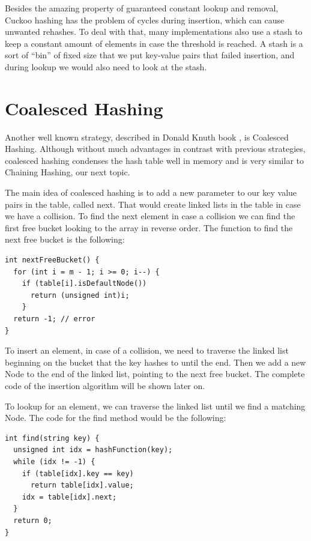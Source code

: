 Besides the amazing property of guaranteed constant lookup and removal, Cuckoo hashing has the problem of cycles during insertion, which can cause unwanted rehashes. To deal with that, many implementations also use a stash to keep a constant amount of elements in case the threshold is reached. A stash is a sort of ``bin'' of fixed size that we put key-value pairs that failed insertion, and during lookup we would also need to look at the stash.

\section{Coalesced Hashing}

Another well known strategy, described in Donald Knuth book \citep{TAOCP3}, is Coalesced Hashing. Although without much advantages in contrast with previous strategies, coalesced hashing condenses the hash table well in memory and is very similar to Chaining Hashing, our next topic.

The main idea of coalesced hashing is to add a new parameter to our key value pairs in the table, called next. That would create linked lists in the table in case we have a collision. To find the next element in case a collision we can find the first free bucket looking to the array in reverse order. The function to find the next free bucket is the following:

\begin{lstlisting}
int nextFreeBucket() {
  for (int i = m - 1; i >= 0; i--) {
    if (table[i].isDefaultNode())
      return (unsigned int)i;
    }
  return -1; // error
}
\end{lstlisting}

To insert an element, in case of a collision, we need to traverse the linked list beginning on the bucket that the key hashes to until the end. Then we add a new Node to the end of the linked list, pointing to the next free bucket. The complete code of the insertion algorithm will be shown later on.

To lookup for an element, we can traverse the linked list until we find a matching Node. The code for the find method would be the following:

\begin{lstlisting}
int find(string key) {
  unsigned int idx = hashFunction(key);
  while (idx != -1) {
    if (table[idx].key == key) 
      return table[idx].value;
    idx = table[idx].next;         
  }    
  return 0;
}
\end{lstlisting}

